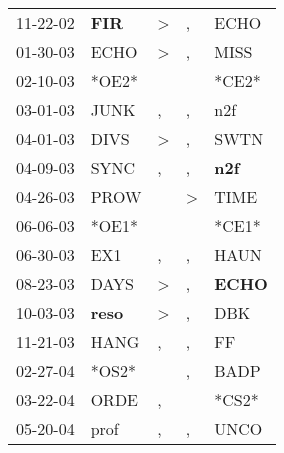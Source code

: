 \begin{supertabular}{p{0.07\textwidth}p{0.06\textwidth}p{0.02\textwidth}p{0.02\textwidth}p{0.06\textwidth}}
 11-22-02\textsuperscript{} &   \textbf{FIR\textsuperscript{}} &     \textgreater &             , &           ECHO\textsuperscript{} \\
 01-30-03\textsuperscript{} &           ECHO\textsuperscript{} &     \textgreater &             , &           MISS\textsuperscript{} \\
 02-10-03\textsuperscript{} &                            *OE2* &                  &               &                            *CE2* \\
 03-01-03\textsuperscript{} &           JUNK\textsuperscript{} &                , &             , &            n2f\textsuperscript{} \\
 04-01-03\textsuperscript{} &           DIVS\textsuperscript{} &     \textgreater &             , &           SWTN\textsuperscript{} \\
 04-09-03\textsuperscript{} &           SYNC\textsuperscript{} &                , &             , &   \textbf{n2f\textsuperscript{}} \\
 04-26-03\textsuperscript{} &           PROW\textsuperscript{} &                  &  \textgreater &           TIME\textsuperscript{} \\
 06-06-03\textsuperscript{} &                            *OE1* &                  &               &                            *CE1* \\
 06-30-03\textsuperscript{} &            EX1\textsuperscript{} &                , &             , &           HAUN\textsuperscript{} \\
 08-23-03\textsuperscript{} &           DAYS\textsuperscript{} &     \textgreater &             , &  \textbf{ECHO\textsuperscript{}} \\
 10-03-03\textsuperscript{} &  \textbf{reso\textsuperscript{}} &     \textgreater &             , &            DBK\textsuperscript{} \\
 11-21-03\textsuperscript{} &           HANG\textsuperscript{} &                , &             , &             FF\textsuperscript{} \\
 02-27-04\textsuperscript{} &                            *OS2* &                  &             , &           BADP\textsuperscript{} \\
 03-22-04\textsuperscript{} &           ORDE\textsuperscript{} &                , &               &                            *CS2* \\
 05-20-04\textsuperscript{} &           prof\textsuperscript{} &                , &             , &           UNCO\textsuperscript{} \\

\end{supertabular}
